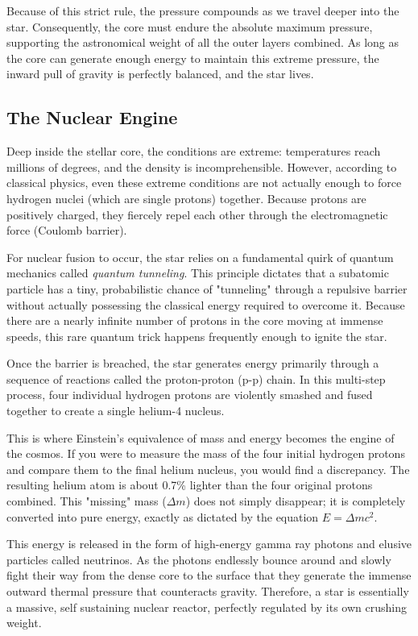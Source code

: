 \documentclass[10pt,a4paper]{article}
\begin{document}
Because of this strict rule, the pressure compounds as we travel deeper into the star. Consequently, the core must endure the absolute maximum pressure, supporting the astronomical weight of all the outer layers combined. As long as the core can generate enough energy to maintain this extreme pressure, the inward pull of gravity is perfectly balanced, and the star lives.

\subsection{The Nuclear Engine}
 Deep inside the stellar core, the conditions are extreme: temperatures reach millions of degrees, and the density is incomprehensible. However, according to classical physics, even these extreme conditions are not actually enough to force hydrogen nuclei (which are single protons) together. Because protons are positively charged, they fiercely repel each other through the electromagnetic force (Coulomb barrier).

For nuclear fusion to occur, the star relies on a fundamental quirk of quantum mechanics called \textit{quantum tunneling}. This principle dictates that a subatomic particle has a tiny, probabilistic chance of "tunneling" through a repulsive barrier without actually possessing the classical energy required to overcome it. Because there are a nearly infinite number of protons in the core moving at immense speeds, this rare quantum trick happens frequently enough to ignite the star.

Once the barrier is breached, the star generates energy primarily through a sequence of reactions called the proton-proton (p-p) chain. In this multi-step process, four individual hydrogen protons are violently smashed and fused together to create a single helium-4 nucleus. 

This is where Einstein's equivalence of mass and energy becomes the engine of the cosmos. If you were to measure the mass of the four initial hydrogen protons and compare them to the final helium nucleus, you would find a discrepancy. The resulting helium atom is about 0.7\% lighter than the four original protons combined. This "missing" mass ($\Delta m$) does not simply disappear; it is completely converted into pure energy, exactly as dictated by the equation $E = \Delta m c^2$. 

This energy is released in the form of high-energy gamma ray photons and elusive particles called neutrinos. As the photons endlessly bounce around and slowly fight their way from the dense core to the surface that they generate the immense outward thermal pressure that counteracts gravity. Therefore, a star is essentially a massive, self sustaining nuclear reactor, perfectly regulated by its own crushing weight.
\end{document}
